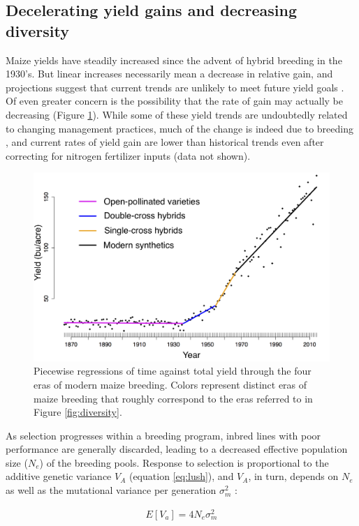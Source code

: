 \documentclass[12pt]{article}
\begin{document}
\subsection*{Decelerating yield gains and decreasing diversity} 

Maize yields have steadily increased since the advent of hybrid breeding in the 1930's.
But linear increases necessarily mean a decrease in relative gain, and projections suggest that current trends are unlikely to meet future yield goals \citep{grassini2013distinguishing}. 
Of even greater concern is the possibility that the rate of gain may actually be decreasing (Figure \ref{fig:piecewise}).
While some of these yield trends are undoubtedly related to changing management practices, much of the change is indeed due to breeding \citep{Duvick:2001fy}, and current rates of yield gain are lower than historical trends even after correcting for nitrogen fertilizer inputs (data not shown). 

\begin{figure}
\includegraphics[width=0.6\linewidth]{yield.png}
\caption{Piecewise regressions of time against total yield through the four eras of modern maize breeding. Colors represent distinct eras of maize breeding that roughly correspond to the eras  referred to in Figure \ref{fig:diversity}.} 
\label{fig:piecewise}
\end{figure}

As selection progresses within a breeding program, inbred lines with poor performance are generally discarded, leading to a decreased effective population size ($N_e$) of the breeding pools.
Response to selection is proportional to the additive genetic variance $V_A$ (equation \ref{eq:lush}), and $V_A$, in turn, depends on $N_e$ as well as the mutational variance per generation ${\sigma}_m^2$ \citep{whitlock1999neutral}:

\begin{align}
E[V_a] = 4N_e {\sigma}_m^2
\label{eq:whitlock}
\end{align}
\end{document}
